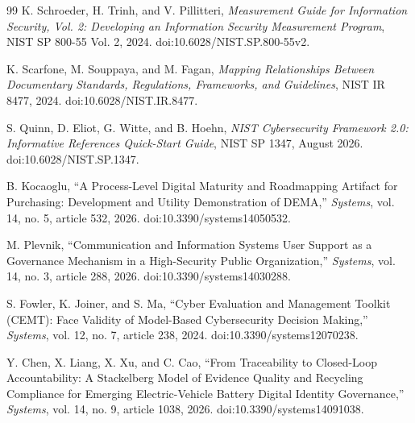 \documentclass[systems,article,submit,moreauthors]{Definitions/mdpi}
\begin{document}
\begin{thebibliography}{99}
 K. Schroeder, H. Trinh, and V. Pillitteri, \emph{Measurement Guide for Information Security, Vol. 2: Developing an Information Security Measurement Program}, NIST SP 800-55 Vol. 2, 2024. doi:10.6028/NIST.SP.800-55v2.

 K. Scarfone, M. Souppaya, and M. Fagan, \emph{Mapping Relationships Between Documentary Standards, Regulations, Frameworks, and Guidelines}, NIST IR 8477, 2024. doi:10.6028/NIST.IR.8477.

 S. Quinn, D. Eliot, G. Witte, and B. Hoehn, \emph{NIST Cybersecurity Framework 2.0: Informative References Quick-Start Guide}, NIST SP 1347, August 2026. doi:10.6028/NIST.SP.1347.

 B. Kocaoglu, ``A Process-Level Digital Maturity and Roadmapping Artifact for Purchasing: Development and Utility Demonstration of DEMA,'' \emph{Systems}, vol. 14, no. 5, article 532, 2026. doi:10.3390/systems14050532.

 M. Plevnik, ``Communication and Information Systems User Support as a Governance Mechanism in a High-Security Public Organization,'' \emph{Systems}, vol. 14, no. 3, article 288, 2026. doi:10.3390/systems14030288.

 S. Fowler, K. Joiner, and S. Ma, ``Cyber Evaluation and Management Toolkit (CEMT): Face Validity of Model-Based Cybersecurity Decision Making,'' \emph{Systems}, vol. 12, no. 7, article 238, 2024. doi:10.3390/systems12070238.

 Y. Chen, X. Liang, X. Xu, and C. Cao, ``From Traceability to Closed-Loop Accountability: A Stackelberg Model of Evidence Quality and Recycling Compliance for Emerging Electric-Vehicle Battery Digital Identity Governance,'' \emph{Systems}, vol. 14, no. 9, article 1038, 2026. doi:10.3390/systems14091038.
\end{thebibliography}
\end{document}
